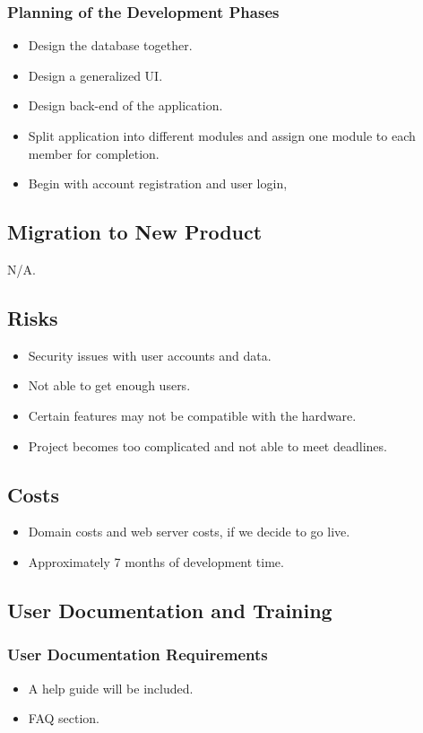 \documentclass[12pt]{article}
\begin{document}
{{{{{{{\subsubsection{Planning of the Development Phases}
\begin{itemize}
    \item Design the database together.
    \item Design a generalized UI.
    \item Design back-end of the application.
    \item Split application into different modules and assign one module to each 
member for completion.
	\item Begin with account registration and user login, 
\end{itemize}

\subsection{Migration to New Product}
N/A.

\subsection{Risks}
\begin{itemize}
  \item Security issues with user accounts and data.
  \item Not able to get enough users.
  \item Certain features may not be compatible with the hardware.
  \item Project becomes too complicated and not able to meet deadlines.
\end{itemize}
\subsection{Costs}
\begin{itemize}
  \item Domain costs and web server costs, if we decide to go live.
  \item Approximately 7 months of development time.
\end{itemize}
\subsection{User Documentation and Training}
\subsubsection{User Documentation Requirements}
\begin{itemize}
  \item A help guide will be included.
  \item FAQ section.
\end{itemize}
}}}}}}}
\end{document}
